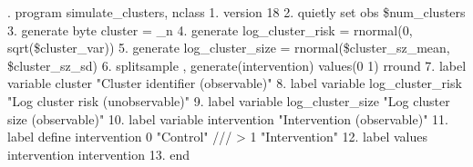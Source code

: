 . program simulate_clusters, nclass
  1.   version 18
  2.   quietly set obs \$num_clusters
  3.   generate byte cluster     = _n
  4.   generate log_cluster_risk = rnormal(0, sqrt(\$cluster_var))
  5.   generate log_cluster_size = rnormal(\$cluster_sz_mean, \$cluster_sz_sd)
  6.   splitsample , generate(intervention) values(0 1) rround
  7.   label variable cluster          "Cluster identifier (observable)"
  8.   label variable log_cluster_risk "Log cluster risk (unobservable)"
  9.   label variable log_cluster_size "Log cluster size (observable)"
 10.   label variable intervention     "Intervention (observable)"
 11.   label define   intervention     0 "Control"                          ///
>                                      1 "Intervention"
 12.   label values   intervention     intervention
 13. end
{\smallskip}
